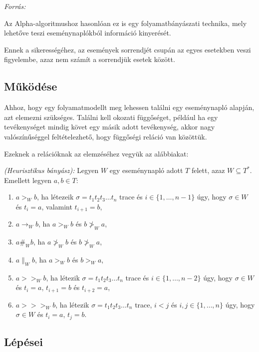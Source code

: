 \textit{Forrás: \cite{wiki:001}}


Az Alpha-algoritmushoz hasonlóan ez is egy folyamatbányászati technika, mely lehetőve teszi eseménynaplókból információ kinyerését.

Ennek a sikerességéhez, az események sorrendjét csupán az egyes esetekben veszi figyelembe, azaz nem számít a sorrendjük esetek között.

\subsection{Működése}

Ahhoz, hogy egy folyamatmodellt meg lehessen találni egy eseménynapló alapján, azt elemezni szükséges. Találni kell okozati függőséget, például ha egy tevékenységet mindig követ egy másik adott tevékenység, akkor nagy valószínűséggel feltételezhető, hogy függőségi reláció van közöttük. 

Ezeknek a relációknak az elemzéséhez vegyük az alábbiakat:

\begin{definition}{\textit{(Heurisztikus bányász):}} Legyen $W$ egy eseménynapló adott $T$ felett, azaz $W \subseteq T^*$. Emellett legyen $a,b \in T:$
\begin{enumerate}

\item $ a>_W b $, ha létezeik $\sigma = t_1 t_2 t_3 \ldots t_n $ trace és $i \in \{1, \ldots ,n-1\}$ úgy, hogy $\sigma \in W$ és $t_i=a$, valamint $t_{i+1}=b$,
\item $ a \rightarrow_W b $, ha $a>_W b$ és $b\ngtr_W a$, 
\item $ a\#_Wb $, ha $a \ngtr_W b$ és $b\ngtr_W a$,
\item $a\parallel_Wb $, ha $a>_W b$ és $b>_Wa$,
\item $a >>_Wb$, ha létezik $\sigma = t_1 t_2 t_3 \ldots t_n $ trace és $i \in \{1, \ldots ,n-2\}$ úgy, hogy $\sigma \in W$ és $t_i=a$, $t_{i+1}=b$ és $t_{i+2}=a$,
\item $a>>>_Wb$, ha létezik $\sigma = t_1 t_2 t_3 \ldots t_n $ trace, $i<j$ és $i,j \in \{1,\ldots,n\}$ úgy, hogy $\sigma \in W$ és $t_i=a$, $t_j=b$.

\end{enumerate}
\end{definition}

\subsection{Lépései}

